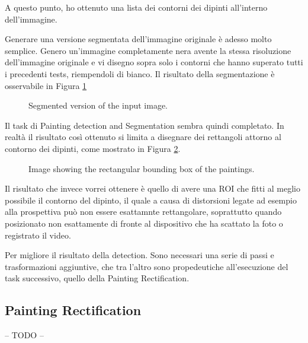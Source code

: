 \documentclass[10pt,twocolumn,letterpaper]{article}
\begin{document}
A questo punto, ho ottenuto una lista dei contorni dei dipinti all'interno dell'immagine.

Generare una versione segmentata dell'immagine originale è adesso molto semplice. Genero un'immagine completamente nera avente la stessa risoluzione dell'immagine originale e vi disegno sopra solo i contorni che hanno superato tutti i precedenti tests, riempendoli di bianco. Il risultato della segmentazione è osservabile in Figura \ref{fig:imageSegmented}

\begin{figure}[t]
   \begin{center}
   \fbox{\rule{0pt}{2in} \rule{0.9\linewidth}{0pt}}
   \end{center}
      \caption{Segmented version of the input image.}
   \label{fig:imageSegmented}
\end{figure}

Il task di Painting detection and Segmentation sembra quindi completato. In realtà il risultato così ottenuto si limita a disegnare dei rettangoli attorno al contorno dei dipinti, come mostrato in Figura \ref{fig:imageRectROI}.

\begin{figure}[t]
   \begin{center}
   \fbox{\rule{0pt}{2in} \rule{0.9\linewidth}{0pt}}
   \end{center}
      \caption{Image showing the rectangular bounding box of the paintings.}
   \label{fig:imageRectROI}
\end{figure}

Il risultato che invece vorrei ottenere è quello di avere una ROI che fitti al meglio possibile il contorno del dipinto, il quale a causa di distorsioni legate ad esempio alla prospettiva può non essere esattamnte rettangolare, soprattutto quando posizionato non esattamente di fronte al dispositivo che ha scattato la foto o registrato il video.

Per migliore il risultato della detection. Sono necessari una serie di passi e trasformazioni aggiuntive, che tra l'altro sono propedeutiche all'esecuzione del task successivo, quello della Painting Rectification.



\subsection{Painting Rectification}
-- TODO --
\end{document}

